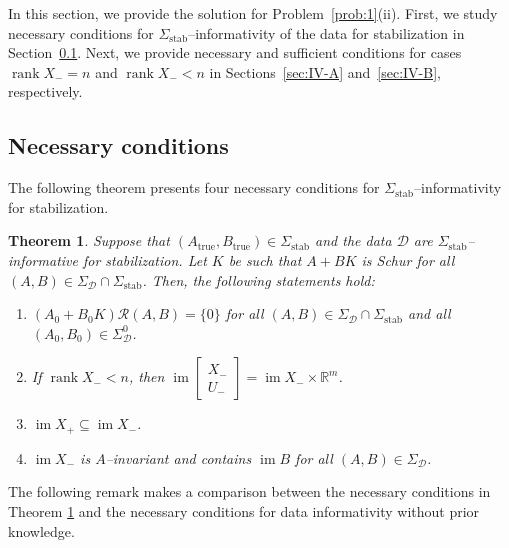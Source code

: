 \documentclass[9pt,shortpaper,twoside,web]{ieeecolor}
\DeclareMathOperator{\rank}{rank}
\DeclareMathOperator{\im}{im}
\newtheorem{theorem}{Theorem}
\begin{document}
In this section, we provide the solution for Problem~\ref{prob:1}(ii). First, we study necessary conditions for $\Sigma_\text{stab}$--informativity of the data for stabilization in Section~\ref{sec:IV-0}. Next, we provide necessary and sufficient conditions for cases $\rank X_-=n$ and $\rank X_-<n$ in Sections~\ref{sec:IV-A} and~\ref{sec:IV-B}, respectively. 

\subsection{Necessary conditions}
\label{sec:IV-0}

The following theorem presents four necessary conditions for $\Sigma_\text{stab}$--informativity for stabilization. 

\begin{theorem}
\label{th:nec_cond}
Suppose that $(A_\text{true},B_\text{true})\in\Sigma_\text{stab}$ and the data $\mathcal{D}$ are \mbox{$\Sigma_\text{stab}$--informative} for stabilization. Let $K$ be such that $A+BK$ is Schur for all \mbox{$(A,B)\in\Sigma_\mathcal{D}\cap\Sigma_\text{stab}$}. Then, the following statements hold:
\begin{enumerate}[label=(\alph*),ref=\ref{th:nec_cond}(\alph*)]
    \item\label{th:nec_cond(b)} $(A_0+B_0K)\mathcal{R}(A,B)=\{0\}$ for all $(A,B)\in\Sigma_\mathcal{D}\cap\Sigma_\text{stab}$ and all $(A_0,B_0)\in\Sigma_\mathcal{D}^0$. 
    \item\label{th:nec_cond(c)} If $\rank X_-<n$, then $\im \begin{bmatrix}
    X_- \\ U_-
    \end{bmatrix}=\im X_- \times \mathbb{R}^m$. 
    \item\label{th:nec_cond(d)} $\im X_+\subseteq \im X_-$.
    \item\label{th:nec_cond(e)} $\im X_-$ is $A$--invariant and contains $\im B$ for all $(A,B)\in\Sigma_\mathcal{D}$.
\end{enumerate}
\end{theorem}

The following remark makes a comparison between the necessary conditions in Theorem \ref{th:nec_cond} and the necessary conditions for data informativity without prior knowledge. 
\end{document}
